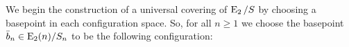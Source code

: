 \begin{const}\label{con:unicover} We begin the construction of a universal
covering of $\operatorname{E}_2 \slash S$ by choosing a basepoint in each configuration space.
So, for all $n \geq 1$ we choose the basepoint $\bar{b}_n \in \operatorname{E}_2(n) \slash
S_n$ to be the following configuration:

\begin{center}
\end{center}


\end{const}
